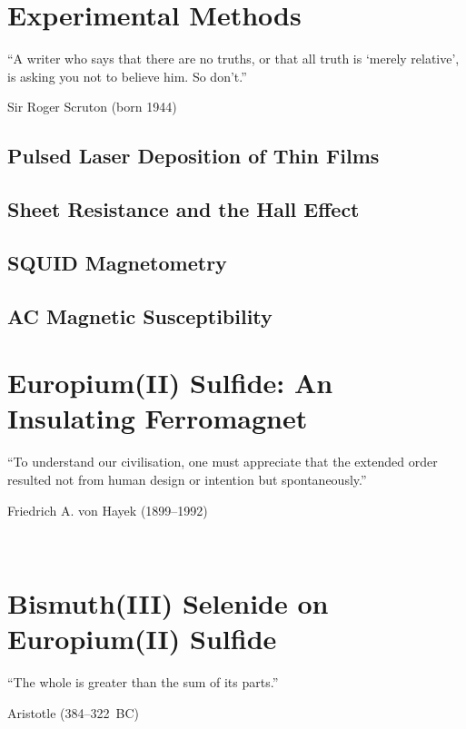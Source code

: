 ﻿\documentclass{report}
\begin{document}
\chapter{Experimental Methods}\label{ch:methods}%
\begin{refsection}   
\epigraph{``A writer who says that there are no truths, or that all truth is `merely relative', is asking you not to believe him. So don't.''}{Sir Roger Scruton (born 1944)}
    \section{Pulsed Laser Deposition of Thin Films}\label{sec:pld}
		
    \section{Sheet Resistance and the Hall Effect}\label{sec:vdp}
		
    \section{SQUID Magnetometry}\label{sec:squid}
        
    \section{AC Magnetic Susceptibility}\label{sec:acm}
        
    \printbibliography[heading=subbibintoc, title=References]
\end{refsection} 


\chapter{Europium(II) Sulfide: An Insulating Ferromagnet}\label{ch:EuS}
\begin{refsection}
\epigraph{``To understand our civilisation, one must appreciate that the extended order resulted not from human design or intention but spontaneously.''}{Friedrich A. von Hayek (1899--1992)}~\\
    
    \printbibliography[heading=subbibintoc, title=References]
\end{refsection} 

\chapter{Bismuth(III) Selenide on Europium(II) Sulfide}\label{ch:bilayer2014}
\begin{refsection} 
\epigraph{``The whole is greater than the sum of its parts.''}{Aristotle (384--322~BC)}~\\
    
    \printbibliography[heading=subbibintoc, title=References]
\end{refsection} 
\end{document}

